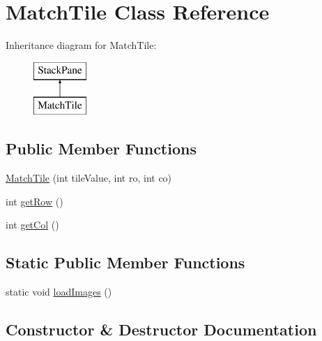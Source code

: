 \hypertarget{class_match_tile}{}\section{Match\+Tile Class Reference}
\label{class_match_tile}
Inheritance diagram for Match\+Tile\+:\begin{figure}[H]
\begin{center}
\leavevmode
\includegraphics[height=2.000000cm]{class_match_tile}
\end{center}
\end{figure}
\subsection*{Public Member Functions}
\begin{DoxyCompactItemize}
\item 
\mbox{\hyperlink{class_match_tile_a273188eda4544581d4424e4681c33fb0}{Match\+Tile}} (int tile\+Value, int ro, int co)
\item 
int \mbox{\hyperlink{class_match_tile_a1524b5b7c525f3af9533cf8f83cacc13}{get\+Row}} ()
\item 
int \mbox{\hyperlink{class_match_tile_a76b318319525d1945da6402652c347b7}{get\+Col}} ()
\end{DoxyCompactItemize}
\subsection*{Static Public Member Functions}
\begin{DoxyCompactItemize}
\item 
static void \mbox{\hyperlink{class_match_tile_a0637f46e6d19de24cfe69181fe480284}{load\+Images}} ()
\end{DoxyCompactItemize}


\subsection{Constructor \& Destructor Documentation}
\mbox{\label{class_match_tile_a273188eda4544581d4424e4681c33fb0}} 
